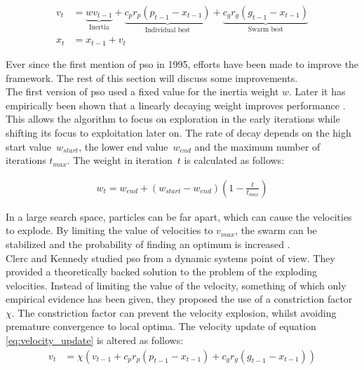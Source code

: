 \begin{align} 
v_{t} &= \underbrace{wv_{t-1}}_\text{Inertia} + \underbrace{c_pr_p(p_{t-1} - x_{t-1})}_\text{Individual best} + \underbrace{c_gr_g(g_{t-1} - x_{t-1})}_\text{Swarm best} \label{eq:velocity_update}\\
x_{t} &= x_{t-1} + v_{t} \label{eq:position_update}
\end{align}

Ever since the first mention of \gls{pso} in 1995, efforts have been made to improve the framework. The rest of this section will discuss some improvements.\\

The first version of \gls{pso} used a fixed value for the inertia weight $w$. Later it has empirically been shown that a linearly decaying weight improves performance \cite{pso_study}. This allows the algorithm to focus on exploration in the early iterations while shifting its focus to exploitation later on. The rate of decay depends on the high start value~$w_{start}$, the lower end value~$w_{end}$ and the maximum number of iterations $t_{max}$. The weight in iteration~$t$ is calculated as follows:

\begin{align}
w_t = w_{end} + (w_{start} - w_{end})\left(1 - \frac{t}{t_{max}}\right) \label{eq:weight}
\end{align}

In a large search space, particles can be far apart, which can cause the velocities to explode. By limiting the value of velocities to $v_{max}$, the swarm can be stabilized and the probability of finding an optimum is increased \cite{pso}.\\

Clerc and Kennedy \cite{constriction_factor} studied \gls{pso} from a dynamic systems point of view. They provided a theoretically backed solution to the problem of the exploding velocities. Instead of limiting the value of the velocity, something of which only empirical evidence has been given, they proposed the use of a constriction factor $\chi$. The constriction factor can prevent the velocity explosion, whilst avoiding premature convergence to local optima. The velocity update of equation \ref{eq:velocity_update} is altered as follows:
\begin{align*}
	v_{t} &= \chi (v_{t-1} + c_pr_p(p_{t-1} - x_{t-1}) + c_gr_g(g_{t-1} - x_{t-1}))
\end{align*}

